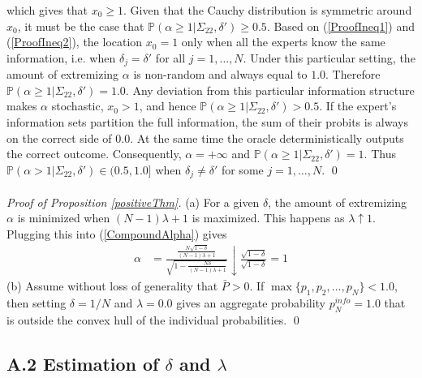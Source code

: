 \documentclass[11pt]{article}
\renewcommand{\P}{\mathbb{P}}
\theoremstyle{definition}
\theoremstyle{definition}
\begin{document}
which gives that $x_0 \geq 1$. Given that the Cauchy distribution is symmetric around $x_0$, it must be the case that $\P(\alpha \geq 1 | \Sigma_{22}, \delta') \geq 0.5$. Based on (\ref{ProofIneq1}) and (\ref{ProofIneq2}), the location $x_0 = 1$ only when all the experts know the same information, i.e. when $\delta_j = \delta'$ for all $j = 1, \dots, N$. Under this particular setting, the amount of extremizing $\alpha$ is non-random and always equal to $1.0$. Therefore $\P(\alpha \geq 1 | \Sigma_{22}, \delta') = 1.0$.  Any deviation from this particular information structure makes $\alpha$ stochastic, $x_0 > 1$, and hence $\P(\alpha \geq 1 | \Sigma_{22}, \delta') > 0.5$. If the expert's information sets partition the full information, the sum of their probits is always on the correct side of $0.0$. At the same time the oracle deterministically outputs the correct outcome. Consequently, $\alpha = +\infty$ and $\P(\alpha \geq 1 | \Sigma_{22}, \delta') = 1$. Thus $\P(\alpha > 1 | \Sigma_{22}, \delta') \in (0.5, 1.0]$ when $\delta_j \neq \delta'$ for some $j = 1, \dots, N$. \qed
\\
\\
\noindent
\textit{Proof of Proposition \ref{positiveThm}.} (a) For a given $\delta$, the amount of extremizing $\alpha$ is minimized when $(N-1)\lambda +1$ is maximized. This happens as $\lambda \uparrow 1$. Plugging this into (\ref{CompoundAlpha}) gives
\begin{align*}
\alpha &= \frac{\frac{N\sqrt{1-\delta}}{(N-1)\lambda +1}}{\sqrt{1- \frac{N\delta}{(N-1)\lambda +1} }}  \downarrow \frac{\sqrt{1-\delta}}{\sqrt{1-\delta }} = 1
\end{align*}
(b) Assume without loss of generality that $\bar{P} > 0$. If $\max\{p_1, p_2, \dots, p_N \} < 1.0$, then  setting $\delta = 1/N$ and $\lambda = 0.0$ gives an aggregate probability $p_N^{info} = 1.0$ that is outside the convex hull of the individual probabilities.
\qed

\subsection*{A.2 Estimation of $\delta$ and $\lambda$}
\end{document}

